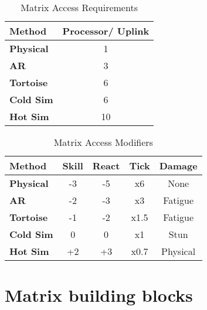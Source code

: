 \begin{table}[htb]
    \caption[Matrix Access Requirements]{Matrix Access Requirements}
    \label{tab:matrix access requirements}
    \centering
    \begin{tabular}{lc}
        \toprule
        \textbf{Method}   & \textbf{Processor}/ \textbf{Uplink} \\
        \midrule
        \textbf{Physical} & 1                                   \\
        \textbf{AR}       & 3                                   \\
        \textbf{Tortoise} & 6                                   \\
        \textbf{Cold Sim} & 6                                   \\
        \textbf{Hot Sim}  & 10                                  \\
        \bottomrule
    \end{tabular}
\end{table}

\begin{table}[htb]
    \caption[Matrix Access Modifiers]{Matrix Access Modifiers}
    \label{tab:matrix access mods}
    \centering
    \begin{tabular}{lcccc}
        \toprule
        \textbf{Method}   & \textbf{Skill} & \textbf{React} & \textbf{Tick} & \textbf{Damage} \\
        \midrule
        \textbf{Physical} & -3             & -5             & x6            & None            \\
        \textbf{AR}       & -2             & -3             & x3            & Fatigue         \\
        \textbf{Tortoise} & -1             & -2             & x1.5          & Fatigue         \\
        \textbf{Cold Sim} & 0              & 0              & x1            & Stun            \\
        \textbf{Hot Sim}  & +2             & +3             & x0.7          & Physical        \\
        \bottomrule
    \end{tabular}
\end{table}

\section{Matrix building blocks}


